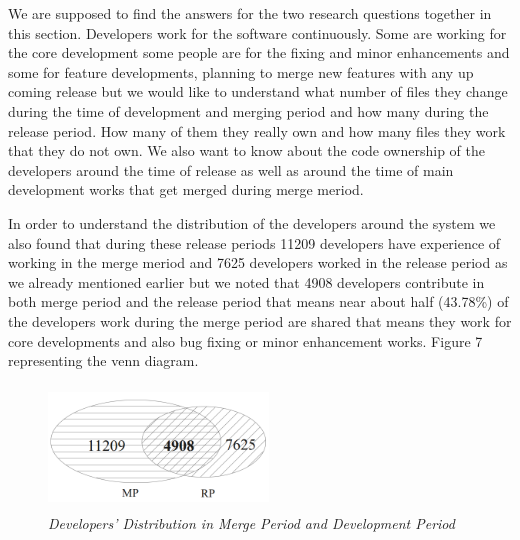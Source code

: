 \documentclass{acm_proc_article-sp}
\begin{document}
We are supposed to find the answers for the two research questions together in this section. Developers work for the software continuously. Some are working for the core development some people are for the fixing and minor enhancements and some for feature developments, planning to merge new features with any up coming release but we would like to understand what number of files they change during the time of development and merging period and how many during the release period. How many of them they really own and how many files they work that they do not own. We also want to know about the code ownership of the developers around the time of release as well as around the time of main development works that get merged during merge meriod.

In order to understand the distribution of the developers around the system we also found that during these release periods 11209 developers have experience of working in the merge meriod and 7625 developers worked in the release period as we already mentioned earlier but we noted that 4908 developers contribute in both merge period and the release period that means near about half (43.78\%) of the developers work during the merge period are shared that means they work for core developments and also bug fixing or minor enhancement works. Figure 7 representing the venn diagram.
\begin{figure}
\begin{center}
\includegraphics[height=1.3in,width=2.3in]{devDistMPRPvenn.png}
\caption{\small \sl Developers' Distribution in Merge Period and Development Period}
\end{center}
\end{figure}
\end{document}
